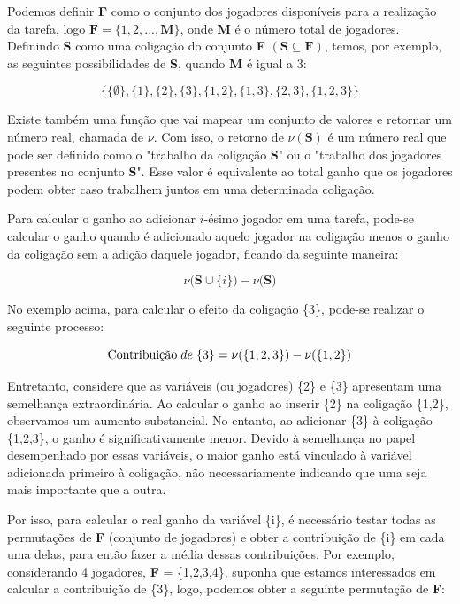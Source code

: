 Podemos definir \textbf{F} como o conjunto dos jogadores disponíveis para a realização da tarefa, 
logo $\textbf{F} = \{1,2,..., \textbf{M}\}$, onde \textbf{M} é o número total de jogadores.
Definindo \textbf{S} como uma coligação do conjunto \textbf{F} $(\textbf{S} \subseteq \textbf{F})$, temos, por exemplo, as seguintes possibilidades de \textbf{S}, quando \textbf{M} é igual a 3:

$$ \{\{\emptyset\},\{1\},\{2\},\{3\},\{1,2\},\{1,3\},\{2,3\},\{1,2,3\}\}$$

Existe também uma função que vai mapear um conjunto de valores e retornar um número real, chamada de $\nu$. Com isso, o retorno de $\nu(\textbf{S})$ é um número real que pode ser definido como 
o "trabalho da coligação \textbf{S}" ou o "trabalho dos jogadores presentes no conjunto \textbf{S}". Esse valor é equivalente ao total ganho que os jogadores podem obter caso trabalhem juntos em uma determinada coligação.

Para calcular o ganho ao adicionar $i$-ésimo jogador em uma tarefa, 
pode-se calcular o ganho quando é adicionado aquelo jogador na coligação menos o ganho da coligação sem 
a adição daquele jogador, ficando da seguinte maneira:

\begin{equation}
  \nu({\textbf{S} \cup \{i\})} - \nu({\textbf{S})}    
\end{equation}


No exemplo acima, para calcular o efeito da coligação \{3\}, pode-se realizar o seguinte processo:

\[
\text{Contribuição} \hspace{1mm} de \hspace{1mm} \{3\} = \nu(\{1,2,3\}) - \nu(\{1,2\})  
\]


Entretanto, considere que as variáveis (ou jogadores) \{2\} e \{3\} apresentam uma semelhança extraordinária.
 Ao calcular o ganho ao inserir \{2\} na coligação \{1,2\}, observamos um aumento substancial. No entanto,
  ao adicionar \{3\} à coligação \{1,2,3\}, o ganho é significativamente menor. Devido à semelhança no papel 
  desempenhado por essas variáveis, o maior ganho está vinculado à variável adicionada primeiro à coligação, 
  não necessariamente indicando que uma seja mais importante que a outra.

Por isso, para calcular o real ganho da variável \{i\}, é necessário testar todas as permutações de \textbf{F} 
(conjunto de jogadores) e obter a contribuição de \{i\} em cada uma delas, para então fazer a média dessas 
contribuições. Por exemplo, considerando 4 jogadores, \textbf{F} = \{1,2,3,4\}, suponha que estamos interessados em calcular
 a contribuição de \{3\}, logo, podemos obter a seguinte permutação de  \textbf{F}:

